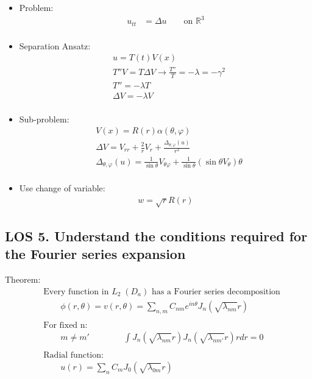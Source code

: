 \documentclass[12pt, a4paper]{article}
\begin{document}
\begin{itemize}
    \item Problem:
    \begin{align*}
        u_{tt} &= \Delta u \qquad \text{on }\mathbb{R}^3\\
    \end{align*}
    \item Separation Ansatz:
    \begin{align*}
        &u = T(t)V(x)\\
        &T''V = T\Delta V \rightarrow \frac{T''}{T} = -\lambda = -\gamma^2\\
        &T'' = -\lambda T\\
        &\Delta V = -\lambda V\\
    \end{align*}
    \item Sub-problem:
    \begin{align*}
        &V(x) = R(r)\alpha(\theta, \varphi)\\
        &\Delta V = V_{rr} + \frac{2}{r}V_r + \frac{\Delta_{\theta, \varphi}(u)}{r^2}\\
        &\Delta_{\theta, \varphi}(u)=\frac{1}{\sin\theta}V_{\theta\varphi} + \frac{1}{\sin\theta}(\sin \theta V_\theta)\theta\\
    \end{align*}
    \item Use change of variable:
    \begin{align*}
        w = \sqrt{r}R(r)
    \end{align*}
\end{itemize}
\vspace{0.3em}

\subsection*{LOS 5. Understand the conditions required for the Fourier series expansion}
Theorem:
\begin{align*}
    &\text{Every function in $L_2\;(D_a)$ has a Fourier series decomposition}\\
    &\qquad \phi(r, \theta) = v(r, \theta) = \sum_{n, m}C_{nm}e^{in\theta}J_n(\sqrt{\lambda_{nm}}r)\\\\
    &\text{For fixed n}:\\
    &\qquad m\ne m' \qquad\qquad \int J_n(\sqrt{\lambda_{nm}}r) J_n(\sqrt{\lambda_{nm'}}r)rdr = 0\\\\
    &\text{Radial function}:\\
    &\qquad u(r) = \sum_nC_mJ_0(\sqrt{\lambda_{0m}}r)
\end{align*}
\vspace{0.3em}
\end{document}
